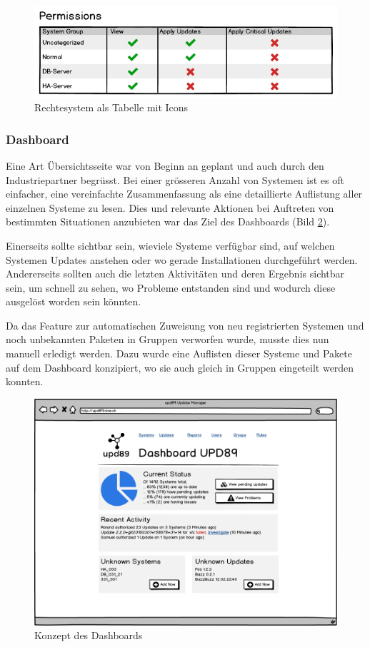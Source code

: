 \begin{figure}[H]
	\centering
	\includegraphics[width=0.75\linewidth]{files/mockups/permission_2}
	\caption{Rechtesystem als Tabelle mit Icons}
	\label{fig:design:permission_2}
\end{figure}

\subsubsection*{Dashboard}

Eine Art Übersichtsseite war von Beginn an geplant und auch durch den Industriepartner begrüsst. Bei einer grösseren Anzahl von Systemen ist es oft einfacher, eine vereinfachte Zusammenfassung als eine detaillierte Auflistung aller einzelnen Systeme zu lesen. Dies und relevante Aktionen bei Auftreten von bestimmten Situationen anzubieten war das Ziel des Dashboards (Bild \ref{fig:design:dashboard_mockup}).

Einerseits sollte sichtbar sein, wieviele Systeme verfügbar sind, auf welchen Systemen Updates anstehen oder wo gerade Installationen durchgeführt werden. Andererseits sollten auch die letzten Aktivitäten und deren Ergebnis sichtbar sein, um schnell zu sehen, wo Probleme entstanden sind und wodurch diese ausgelöst worden sein könnten.

Da das Feature zur automatischen Zuweisung von neu registrierten Systemen und noch unbekannten Paketen in Gruppen verworfen wurde, musste dies nun manuell erledigt werden. Dazu wurde eine Auflisten dieser Systeme und Pakete auf dem Dashboard konzipiert, wo sie auch gleich in Gruppen eingeteilt werden konnten. 

\begin{figure}[H]
	\centering
	\includegraphics[width=\linewidth]{files/mockups/dashboard}
	\caption{Konzept des Dashboards}
	\label{fig:design:dashboard_mockup}
\end{figure}

